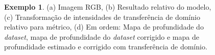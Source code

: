 \begin{figure}[H]
    \centering
    \caption{\textbf{Exemplo 1}. (a) Imagem RGB, (b) Resultado relativo do modelo, (c) Transformação de intensidades de transferência de domínio relativo para métrico, (d) Em ordem: Mapa de profundidade do \textit{dataset}, mapa de profundidade do \textit{dataset} corrigido e mapa de profundidade estimado e corrigido com transferência de domínio.}
    \label{ex1}
\end{figure}

